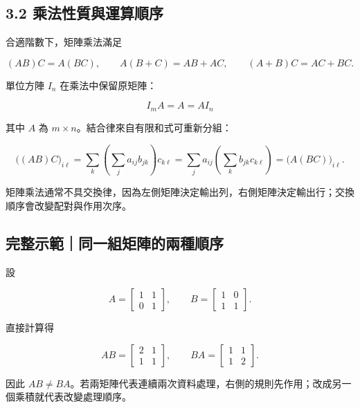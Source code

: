\documentclass[11pt,a4paper]{article}
\begin{document}
\subsection{3.2 乘法性質與運算順序}\label{ux4e58ux6cd5ux6027ux8ceaux8207ux904bux7b97ux9806ux5e8f}

合適階數下，矩陣乘法滿足

\[
(AB)C=A(BC),\qquad A(B+C)=AB+AC,\qquad (A+B)C=AC+BC.
\]

單位方陣 \(I_n\) 在乘法中保留原矩陣：

\[
I_mA=A=AI_n
\]

其中 \(A\) 為 \(m\times n\)。結合律來自有限和式可重新分組：

\[
\bigl((AB)C\bigr)_{i\ell}
=\sum_k\left(\sum_j a_{ij}b_{jk}\right)c_{k\ell}
=\sum_j a_{ij}\left(\sum_k b_{jk}c_{k\ell}\right)
=\bigl(A(BC)\bigr)_{i\ell}.
\]

矩陣乘法通常不具交換律，因為左側矩陣決定輸出列，右側矩陣決定輸出行；交換順序會改變配對與作用次序。

\begin{HandoutWorkedExample}

\subsection{完整示範｜同一組矩陣的兩種順序}\label{ux5b8cux6574ux793aux7bc4ux540cux4e00ux7d44ux77e9ux9663ux7684ux5169ux7a2eux9806ux5e8f}

設

\[
A=\begin{bmatrix}1&1\\0&1\end{bmatrix},
\qquad
B=\begin{bmatrix}1&0\\1&1\end{bmatrix}.
\]

直接計算得

\[
AB=\begin{bmatrix}2&1\\1&1\end{bmatrix},
\qquad
BA=\begin{bmatrix}1&1\\1&2\end{bmatrix}.
\]

因此 \(AB\ne BA\)。若兩矩陣代表連續兩次資料處理，右側的規則先作用；改成另一個乘積就代表改變處理順序。

\end{HandoutWorkedExample}
\end{document}
